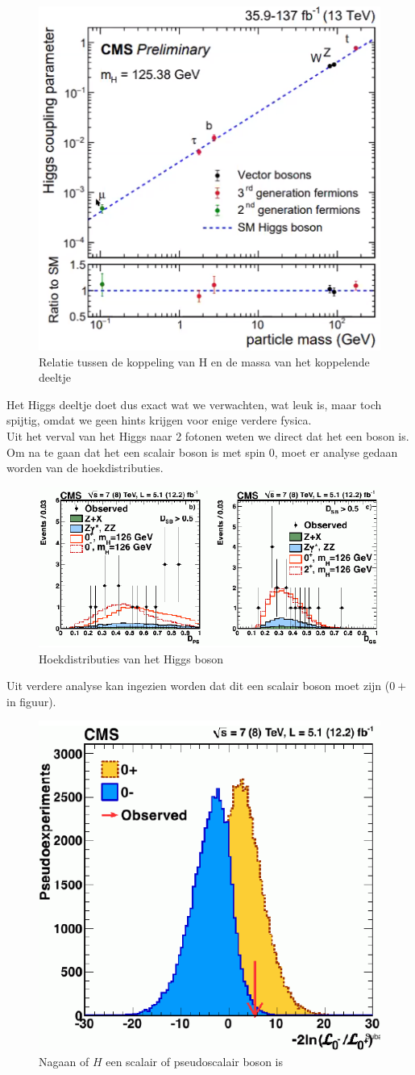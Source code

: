 \documentclass[../main.tex]{subfiles}
\begin{document}
\begin{figure}[h]
    \centering
    \includegraphics[width=0.4\linewidth]{higgs_boson/h_koppeling_massa.png}
    \caption{Relatie tussen de koppeling van H en de massa van het koppelende deeltje}%
    \label{fig:higgs_boson/h_koppeling_massa}
\end{figure}

Het Higgs deeltje doet dus exact wat we verwachten, wat leuk is, maar toch spijtig, omdat we geen hints krijgen voor enige verdere fysica.\\
Uit het verval van het Higgs naar 2 fotonen weten we direct dat het een boson is. Om na te gaan dat het een scalair boson is met spin 0, moet er analyse gedaan worden van de hoekdistributies.

\begin{figure}[h]
    \centering
    \includegraphics[width=0.5\linewidth]{higgs_boson/h_hoek_dist.png}
    \caption{Hoekdistributies van het Higgs boson}%
    \label{fig:higgs_boson/h_hoek_dist}
\end{figure}

Uit verdere analyse kan ingezien worden dat dit een scalair boson moet zijn ($0+$ in figuur).

\begin{figure}[h]
    \centering
    \includegraphics[width=0.5\linewidth]{higgs_boson/h_vec_boson.png}
    \caption{Nagaan of $H$ een scalair of pseudoscalair boson is}%
    \label{fig:higgs_boson/h_vec_boson}
\end{figure}
\end{document}
